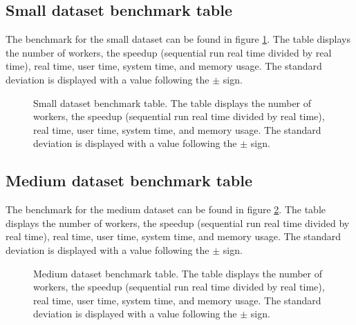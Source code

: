 \subsection{Small dataset benchmark table}
The benchmark for the small dataset can be found in figure \ref{fig:dataset_2_table}.
The table displays the number of workers, the speedup (sequential run real time divided by real time), real time,
user time, system time, and memory usage. The standard deviation is displayed with a value following the $\pm$ sign.

\begin{figure}[ht]
\centering
{}
\caption[Small dataset benchmark table.]{Small dataset benchmark table. The table displays the number of workers, the speedup (sequential run real time divided by real time), real time,
user time, system time, and memory usage. The standard deviation is displayed with a value following the $\pm$ sign.}
\label{fig:dataset_2_table}
\end{figure}

\subsection{Medium dataset benchmark table}
The benchmark for the medium dataset can be found in figure \ref{fig:dataset_3_table}.
The table displays the number of workers, the speedup (sequential run real time divided by real time), real time,
user time, system time, and memory usage. The standard deviation is displayed with a value following the $\pm$ sign.

\begin{figure}[ht]
\centering
{}
\caption[Medium dataset benchmark table.]{Medium dataset benchmark table. The table displays the number of workers, the speedup (sequential run real time divided by real time), real time,
user time, system time, and memory usage. The standard deviation is displayed with a value following the $\pm$ sign.}
\label{fig:dataset_3_table}
\end{figure}

